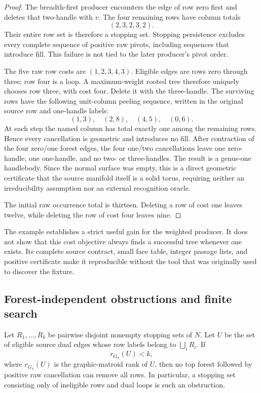 \begin{proof}
The breadth-first producer encounters the edge of row zero first and
deletes that two-handle with $v$.  The four remaining rows have column
totals
\[
  (2,3,2,3,2).
\]
Their entire row set is therefore a stopping set.  Stopping persistence
excludes every complete sequence of positive raw pivots, including
sequences that introduce fill.  This failure is not tied to the later
producer's pivot order.

The five raw row costs are $(1,2,3,4,3)$.  Eligible edges are rows zero
through three; row four is a loop.  A maximum-weight rooted tree
therefore uniquely chooses row three, with cost four.  Delete it with
the three-handle.  The surviving rows have the following unit-column
peeling sequence, written in the original source row and one-handle
labels:
\[
  (1,3),\quad(2,8),\quad(4,5),\quad(0,6).
\]
At each step the named column has total exactly one among the remaining
rows.  Hence every cancellation is geometric and introduces no fill.
After contraction of the four zero/one forest edges, the four one/two
cancellations leave one zero-handle, one one-handle, and no two- or
three-handles.  The result is a genus-one handlebody.  Since the normal
surface was empty, this is a direct geometric certificate that the
source manifold itself is a solid torus, requiring neither an
irreducibility assumption nor an external recognition oracle.

The initial raw occurrence total is thirteen.  Deleting a row of cost
one leaves twelve, while deleting the row of cost four leaves nine.
\end{proof}

The example establishes a strict useful gain for the weighted producer.
It does not show that this cost objective always finds a successful tree
whenever one exists.  Its complete source contract, small face table,
integer passage lists, and positive certificate make it reproducible
without the tool that was originally used to discover the fixture.

\subsection{Forest-independent obstructions and finite search}

\begin{corollary}
\label{cor:cut-dual-rank-obstruction}
Let $R_1,\ldots,R_k$ be pairwise disjoint nonempty stopping sets of $N$.
Let $U$ be the set of eligible source dual edges whose row labels belong
to $\bigcup_iR_i$.  If
\[
  r_{G_x}(U)<k,
\]
where $r_{G_x}(U)$ is the graphic-matroid rank of $U$, then no top forest
followed by positive raw cancellation can remove all rows.  In
particular, a stopping set consisting only of ineligible rows and dual
loops is such an obstruction.
\end{corollary}

